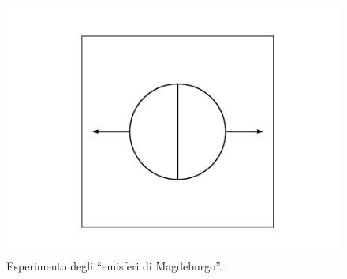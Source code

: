 \documentclass[12pt,a4paper]{book}
\begin{document}
 \begin{figure}[!ht]
 \centering
\includegraphics[scale=0.55]{magde1.pdf}
\caption{Esperimento degli ``emisferi di Magdeburgo''. \label{fig:magde1} }
\end{figure}
\end{document}
